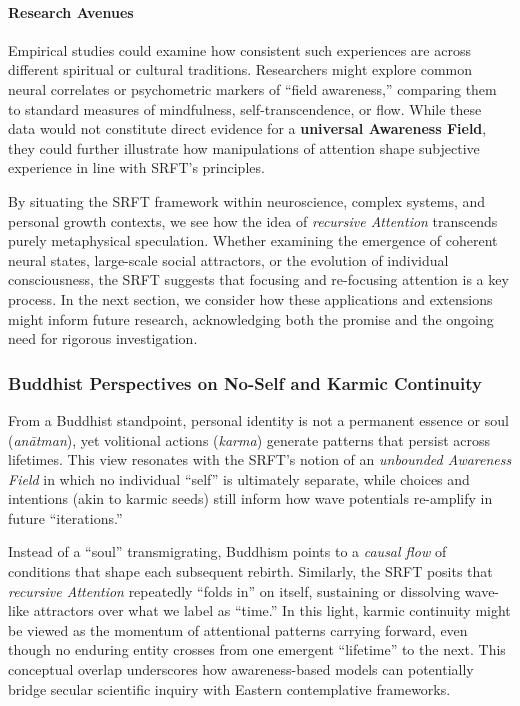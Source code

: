 \documentclass[12pt,a4paper]{article}
\begin{document}
\paragraph{Research Avenues}
Empirical studies could examine how consistent such experiences are across different spiritual or cultural traditions. Researchers might explore common neural correlates or psychometric markers of “field awareness,” comparing them to standard measures of mindfulness, self-transcendence, or flow. While these data would not constitute direct evidence for a \textbf{universal Awareness Field}, they could further illustrate how manipulations of attention shape subjective experience in line with SRFT’s principles.

\medskip

By situating the SRFT framework within neuroscience, complex systems, and personal growth contexts, we see how the idea of \emph{recursive Attention} transcends purely metaphysical speculation. Whether examining the emergence of coherent neural states, large-scale social attractors, or the evolution of individual consciousness, the SRFT suggests that focusing and re-focusing attention is a key process. In the next section, we consider how these applications and extensions might inform future research, acknowledging both the promise and the ongoing need for rigorous investigation.

\subsubsection*{Buddhist Perspectives on No-Self and Karmic Continuity}
From a Buddhist standpoint, personal identity is not a permanent essence or soul (\emph{anātman}), yet volitional actions (\emph{karma}) generate patterns that persist across lifetimes. This view resonates with the SRFT’s notion of an \emph{unbounded Awareness Field} in which no individual “self” is ultimately separate, while choices and intentions (akin to karmic seeds) still inform how wave potentials re-amplify in future “iterations.”

Instead of a “soul” transmigrating, Buddhism points to a \emph{causal flow} of conditions that shape each subsequent rebirth. Similarly, the SRFT posits that \emph{recursive Attention} repeatedly “folds in” on itself, sustaining or dissolving wave-like attractors over what we label as “time.” In this light, karmic continuity might be viewed as the momentum of attentional patterns carrying forward, even though no enduring entity crosses from one emergent “lifetime” to the next. This conceptual overlap underscores how awareness-based models can potentially bridge secular scientific inquiry with Eastern contemplative frameworks. 
\end{document}
